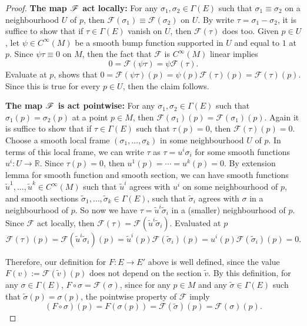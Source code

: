 \documentclass[a4paper]{article}
\theoremstyle{remark}
\newcommand{\er}{\mathbb{R}} %
\newcommand{\CM}{C^{\infty}(M)} %
\newcommand{\Esection}{\Gamma(E)} %
\newcommand{\Fkeriting}{\mathscr{F}} %
\begin{document}
\begin{proof}
\textbf{The map $\boldmath{\Fkeriting}$ act locally: }  For any $\sigma_1,\sigma_2 \in \Esection$ such that $\sigma_1 \equiv \sigma_2$ on a neighbourhood $U$ of $p$, then $\Fkeriting (\sigma_1) \equiv \Fkeriting (\sigma_2) $ on $U$. By write $\tau = \sigma_1 - \sigma_2$, it is suffice to show that if $\tau \in \Esection$ vanish on $U$, then $\Fkeriting (\tau)$ does too. Given $p \in U$, let $\psi \in \CM$ be a smooth bump function supported in $U$ and equal to $1$ at $p$. Since $\psi \tau \equiv 0$ on $M$, then the fact that $\Fkeriting$ is $\CM $ linear implies 
$$
0 = \Fkeriting (\psi \tau) = \psi \Fkeriting(\tau).
$$ 
Evaluate at $p$, shows that $0 = \Fkeriting (\psi \tau)(p) = \psi (p) \Fkeriting(\tau)(p) = \Fkeriting (\tau)(p)$. Since this is true for every $p \in U$, then the claim follows.

\textbf{The map $\boldmath{\Fkeriting}$ is act pointwise: }For any $\sigma_1, \sigma_2 \in \Esection$ such that $\sigma_1(p) = \sigma_2(p)$ at a point $p \in M$, then $\Fkeriting (\sigma_1) (p) = \Fkeriting (\sigma_1)(p)$. Again it is suffice to show that if $\tau \in \Esection$ such that $\tau (p) = 0$, then $\Fkeriting(\tau)(p) = 0$. Choose a smooth local frame $(\sigma_1,\dots, \sigma_k)$ in some neighbourhood $U$ of $p$. In terms of this local frame, we can write $\tau$ as $\tau=u^i \sigma_i$ for some smooth functions $u^i : U \to \er $. Since $\tau(p)=0$, then $u^1(p) = \cdots=u^k(p) = 0$. By extension lemma for smooth function and smooth section, we can have smooth functions $\widetilde{u}^1,\dots,\widetilde{u}^k \in \CM $ such that $\widetilde{u}^i$ agrees with $u^i$ on some neighbourhood of $p$, and smooth sections $\widetilde{\sigma}_1,\dots,\widetilde{\sigma}_k \in \Esection$, such that $\widetilde{\sigma}_i$ agrees with $\sigma$ in a neighbourhood of $p$. So now we have $\tau = \widetilde{u}^i \widetilde{\sigma}_i$ in a (smaller) neighbourhood of $p$. Since $\Fkeriting$ act locally, then $\Fkeriting (\tau) = \Fkeriting (\widetilde{u}^i \widetilde{\sigma}_i)$. Evaluated at $p$
$$
\Fkeriting (\tau) (p) = \Fkeriting (\widetilde{u}^i \widetilde{\sigma}_i) (p) = \widetilde{u}^i(p) \Fkeriting ( \widetilde{\sigma}_i) (p) = u^i(p) \Fkeriting (\widetilde{\sigma}_i) (p) = 0.
$$

Therefore, our definition for $F : E \to E'$ above is well defined, since the value $F(v) := \Fkeriting (\widetilde{v}) (p)$ does not depend on the section $\widetilde{v}$. By this definition, for any $\sigma \in \Esection$, $F \circ \sigma = \Fkeriting (\sigma)$, since for any $p \in M$ and any $\widetilde{\sigma} \in \Esection$ such that $\widetilde{\sigma}(p) = \sigma(p)$, the pointwise property of $\Fkeriting$ imply 
$$
(F \circ \sigma)(p) = F(\sigma(p)) = \Fkeriting(\widetilde{\sigma})(p) = \Fkeriting(\sigma)(p).
$$


\end{proof}
\end{document}
